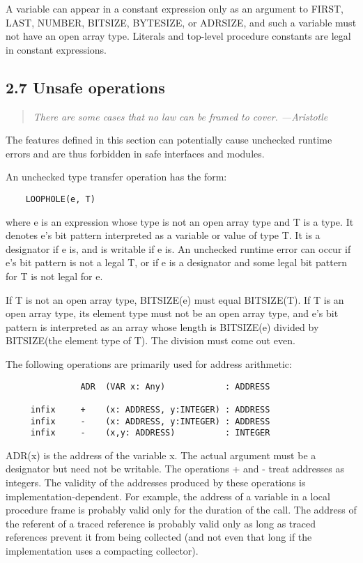 \documentclass[10pt]{article}
\begin{document}
A variable can appear in a constant expression only as an argument to FIRST,
LAST, NUMBER, BITSIZE, BYTESIZE, or ADRSIZE, and such a variable must not have
an open array type.  Literals and top-level procedure constants are legal in
constant expressions.

\subsection*{2.7 Unsafe operations}

\begin{quote}
  \emph{ There are some cases that no law can be framed to cover.  ---Aristotle
  }
\end{quote}

The features defined in this section can potentially cause unchecked runtime
errors and are thus forbidden in safe interfaces and modules.

An unchecked type transfer operation has the form:
\begin{verbatim}
    LOOPHOLE(e, T)
\end{verbatim}
where e is an expression whose type is not an open array type and T is a type.
It denotes e's bit pattern interpreted as a variable or value of type T.  It
is a designator if e is, and is writable if e is.  An unchecked runtime error
can occur if e's bit pattern is not a legal T, or if e is a designator and
some legal bit pattern for T is not legal for e.

If T is not an open array type, BITSIZE(e) must equal BITSIZE(T).  If T is an
open array type, its element type must not be an open array type, and e's bit
pattern is interpreted as an array whose length is BITSIZE(e) divided by
BITSIZE(the element type of T).  The division must come out even.

The following operations are primarily used for address arithmetic:
\begin{verbatim}
               ADR  (VAR x: Any)            : ADDRESS

     infix     +    (x: ADDRESS, y:INTEGER) : ADDRESS
     infix     -    (x: ADDRESS, y:INTEGER) : ADDRESS
     infix     -    (x,y: ADDRESS)          : INTEGER
\end{verbatim}
ADR(x) is the address of the variable x.  The actual argument must be a
designator but need not be writable.  The operations + and - treat addresses
as integers.  The validity of the addresses produced by these operations is
implementation-dependent.  For example, the address of a variable in a local
procedure frame is probably valid only for the duration of the call.  The
address of the referent of a traced reference is probably valid only as long
as traced references prevent it from being collected (and not even that long
if the implementation uses a compacting collector).
\end{document}

